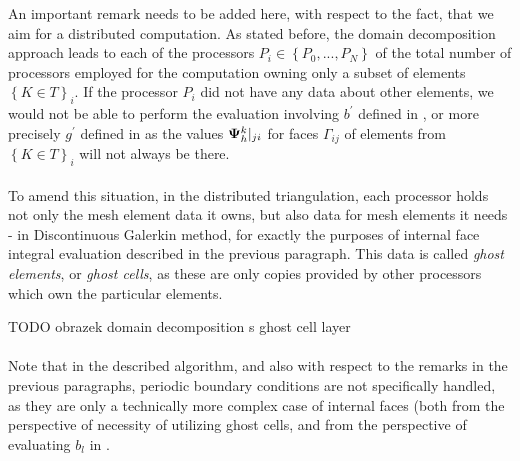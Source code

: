 An important remark needs to be added here, with respect to the fact, that we aim for a distributed computation. As stated before, the domain decomposition approach leads to each of the processors $P_i \in \left\{P_0, ..., P_N\right\}$ of the total number of processors employed for the computation owning only a subset of elements $\left\{K \in T\right\}_i$. If the processor $P_i$ did not have any data about other elements, we would not be able to perform the evaluation involving $b^{'}$ defined in , or more precisely $g^{'}$ defined in  as the values ${\mathrm{\mathbf{\Psi}}_h^{k}}|_{ji}$ for faces $\Gamma_{ij}$ of elements from $\left\{K \in T\right\}_i$ will not always be there.
\paragraph{}
To amend this situation, in the distributed triangulation, each processor holds not only the mesh element data it owns, but also data for mesh elements it needs - in Discontinuous Galerkin method, for exactly the purposes of internal face integral evaluation described in the previous paragraph. This data is called \textit{ghost elements}, or \textit{ghost cells}, as these are only copies provided by other processors which own the particular elements.

TODO obrazek domain decomposition s ghost cell layer

\paragraph{}
Note that in the described algorithm, and also with respect to the remarks in the previous paragraphs, periodic boundary conditions are not specifically handled, as they are only a technically more complex case of internal faces (both from the perspective of necessity of utilizing ghost cells, and from the perspective of evaluating $b_{l}$ in .